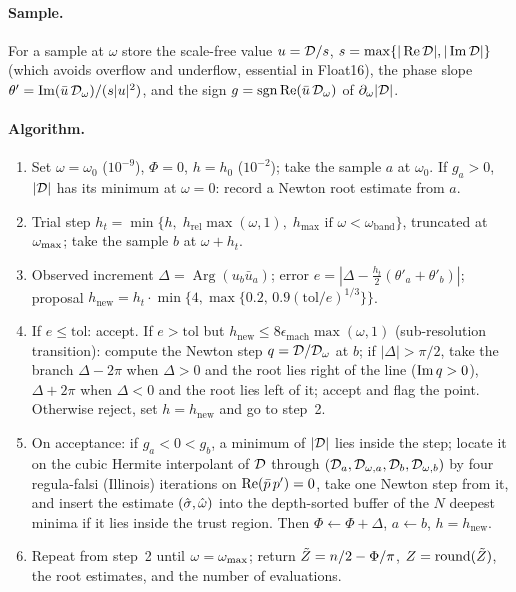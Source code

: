 \paragraph{Sample.} For a sample at $\omega$ store the scale-free value
$u=\mathcal{D}/s$, $s=\max\{|\operatorname{Re}\mathcal{D}|,|\operatorname{Im}\mathcal{D}|\}$ (which avoids overflow and
underflow, essential in Float16), the phase slope
$\theta'=\operatorname{Im}(\bar u\,\mathcal{D}_\omega)/(s|u|^{2})$, and the sign
$g=\operatorname{sgn}\operatorname{Re}(\bar u\,\mathcal{D}_\omega)$ of $\partial_\omega|\mathcal{D}|$.

\paragraph{Algorithm.}
\begin{enumerate}
  \item Set $\omega=\omega_0$ ($10^{-9}$), $\Phi=0$, $h=h_0$ ($10^{-2}$);
    take the sample $a$ at $\omega_0$. If $g_a>0$, $|\mathcal{D}|$ has its minimum at
    $\omega=0$: record a Newton root estimate from $a$.
  \item Trial step $h_t=\min\{h,\;h_{\mathrm{rel}}\max(\omega,1),\;h_{\max}
    \text{ if }\omega<\omega_{\mathrm{band}}\}$, truncated at $\omega_{\mathrm{max}}$; take the
    sample $b$ at $\omega+h_t$.
  \item Observed increment $\Delta=\operatorname{Arg}(u_b\bar u_a)$; error
    $e=|\Delta-\tfrac{h_t}{2}(\theta'_a+\theta'_b)|$; proposal
    $h_{\mathrm{new}}=h_t\cdot\min\{4,\max\{0.2,\,0.9(\mathrm{tol}/e)^{1/3}\}\}$.
  \item If $e\le\mathrm{tol}$: accept. If $e>\mathrm{tol}$ but
    $h_{\mathrm{new}}\le8\epsilon_{\mathrm{mach}}\max(\omega,1)$ (sub-resolution
    transition): compute the Newton step $q=\mathcal{D}/\mathcal{D}_\omega$ at $b$; if
    $|\Delta|>\pi/2$, take the branch $\Delta-2\pi$ when $\Delta>0$ and the
    root lies right of the line ($\operatorname{Im} q>0$), $\Delta+2\pi$ when $\Delta<0$
    and the root lies left of it; accept and flag the point. Otherwise reject,
    set $h=h_{\mathrm{new}}$ and go to step~2.
  \item On acceptance: if $g_a<0<g_b$, a minimum of $|\mathcal{D}|$ lies inside the
    step; locate it on the cubic Hermite interpolant of $\mathcal{D}$ through
    $(\mathcal{D}_a,\mathcal{D}_{\omega,a},\mathcal{D}_b,\mathcal{D}_{\omega,b})$ by four regula-falsi
    (Illinois) iterations on $\operatorname{Re}(\bar p\,p')=0$, take one Newton step from
    it, and insert the estimate $(\hat{\sigma},\hat{\omega})$ into the depth-sorted buffer of
    the $N$ deepest minima if it lies inside the trust region. Then
    $\Phi\leftarrow\Phi+\Delta$, $a\leftarrow b$, $h=h_{\mathrm{new}}$.
  \item Repeat from step~2 until $\omega=\omega_{\mathrm{max}}$; return
    $\tilde{Z}=n/2-\Phi/\pi$, $Z=\operatorname{round}(\tilde{Z})$, the root
    estimates, and the number of evaluations.
\end{enumerate}

